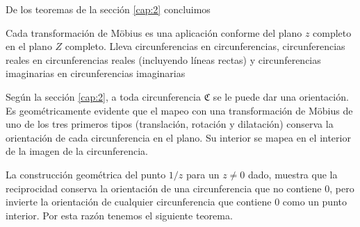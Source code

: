 \documentclass{matematicasud}
\begin{document}
De los teoremas de la sección \ref{cap:2} concluimos
\begin{teorema}
    Cada transformación de Möbius es una aplicación conforme del plano $z$ completo en el plano $Z$ completo. Lleva circunferencias en circunferencias, circunferencias reales en circunferencias reales (incluyendo líneas rectas) y circunferencias imaginarias en circunferencias imaginarias
\end{teorema}
Según la sección \ref{cap:2}, a toda circunferencia $\mathfrak{C}$ se le puede dar una orientación. Es geométricamente evidente que el mapeo con una transformación de Möbius de uno de los tres primeros tipos (translación, rotación y dilatación) conserva la orientación de cada circunferencia en el plano. Su interior se mapea en el interior de la imagen de la circunferencia.

La construcción geométrica del punto $1/z$ para un $z\neq 0$ dado, muestra que la reciprocidad conserva la orientación de una circunferencia que no contiene $0$, pero invierte la orientación de cualquier circunferencia que contiene $0$ como un punto interior. Por esta razón tenemos el siguiente teorema.
\end{document}
